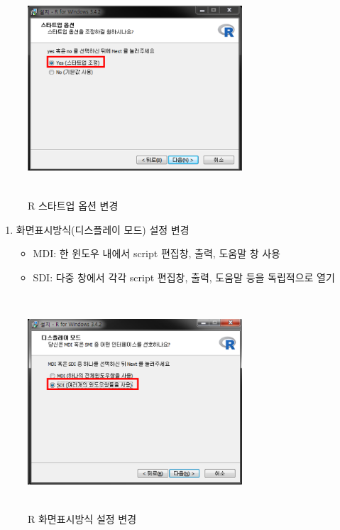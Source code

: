 \documentclass[12pt,a4paper]{book}
\providecommand{\tightlist}{%
  \setlength{\itemsep}{0pt}\setlength{\parskip}{0pt}}
\theoremstyle{definition}
\theoremstyle{definition}
\theoremstyle{definition}
\theoremstyle{remark}
\begin{document}
\begin{figure}[H]
{
  \centering
  \includegraphics[width = 8cm, height = 8cm]{Figures/R-install-F05.png}
  \caption[R 스타트업 옵션 변경]{R 스타트업 옵션 변경}\label{fig:R-install-10}
}
\end{figure}

\begin{enumerate}
\def\labelenumi{\arabic{enumi}.}
\setcounter{enumi}{11}
\tightlist
\item
  화면표시방식(디스플레이 모드) 설정 변경

  \begin{itemize}
  \tightlist
  \item
    MDI: 한 윈도우 내에서 script 편집창, 출력, 도움말 창 사용
  \item
    SDI: 다중 창에서 각각 script 편집창, 출력, 도움말 등을 독립적으로
    열기
  \end{itemize}
\end{enumerate}

\begin{figure}[H]
{
  \centering
  \includegraphics[width = 8cm, height = 8cm]{Figures/R-install-F06.png}
  \caption[R 화면표시방식 설정 변경]{R 화면표시방식 설정 변경}\label{fig:R-install-11}
}
\end{figure}
\end{document}
